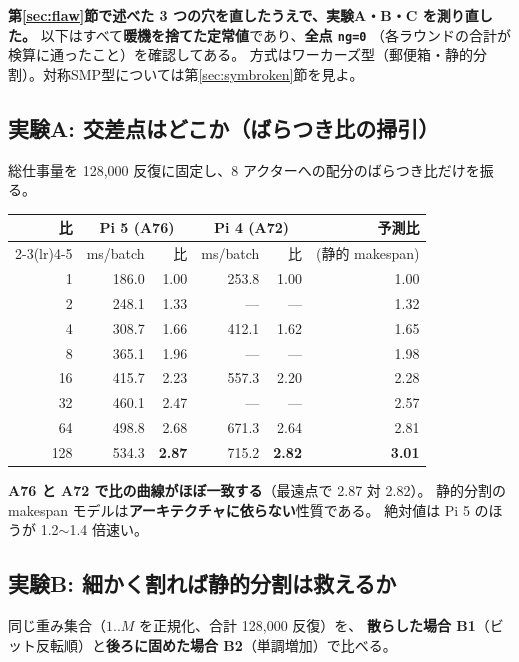 \documentclass[a4paper,11pt]{ltjsarticle}
\begin{document}
\textbf{第\ref{sec:flaw}節で述べた 3 つの穴を直したうえで、実験A・B・C を測り直した。}
以下はすべて\textbf{暖機を捨てた定常値}であり、\textbf{全点 \texttt{ng=0}}
（各ラウンドの合計が検算に通ったこと）を確認してある。
方式はワーカーズ型（郵便箱・静的分割）。対称SMP型については第\ref{sec:symbroken}節を見よ。

\subsection{実験A: 交差点はどこか（ばらつき比の掃引）}
総仕事量を 128{,}000 反復に固定し、8 アクターへの配分のばらつき比だけを振る。

\begin{center}
\begin{tabular}{rrrrrr}
\toprule
比 & \multicolumn{2}{c}{Pi 5 (A76)} & \multicolumn{2}{c}{Pi 4 (A72)} & 予測比 \\
\cmidrule(lr){2-3}\cmidrule(lr){4-5}
 & ms/batch & 比 & ms/batch & 比 & (静的 makespan) \\
\midrule
1 & 186.0 & 1.00 & 253.8 & 1.00 & 1.00 \\
2 & 248.1 & 1.33 & --- & --- & 1.32 \\
4 & 308.7 & 1.66 & 412.1 & 1.62 & 1.65 \\
8 & 365.1 & 1.96 & --- & --- & 1.98 \\
16 & 415.7 & 2.23 & 557.3 & 2.20 & 2.28 \\
32 & 460.1 & 2.47 & --- & --- & 2.57 \\
64 & 498.8 & 2.68 & 671.3 & 2.64 & 2.81 \\
128 & 534.3 & \textbf{2.87} & 715.2 & \textbf{2.82} & \textbf{3.01} \\
\bottomrule
\end{tabular}
\end{center}

\noindent
\textbf{A76 と A72 で比の曲線がほぼ一致する}（最遠点で 2.87 対 2.82）。
静的分割の makespan モデルは\textbf{アーキテクチャに依らない}性質である。
絶対値は Pi 5 のほうが 1.2$\sim$1.4 倍速い。

\subsection{実験B: 細かく割れば静的分割は救えるか}
同じ重み集合（$1..M$ を正規化、合計 128{,}000 反復）を、
\textbf{散らした場合 B1}（ビット反転順）と\textbf{後ろに固めた場合 B2}（単調増加）で比べる。
\end{document}
